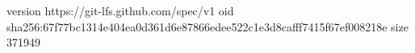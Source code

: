 version https://git-lfs.github.com/spec/v1
oid sha256:67f77bc1314e404ea0d361d6e87866edee522c1e3d8cafff7415f67ef008218e
size 371949
